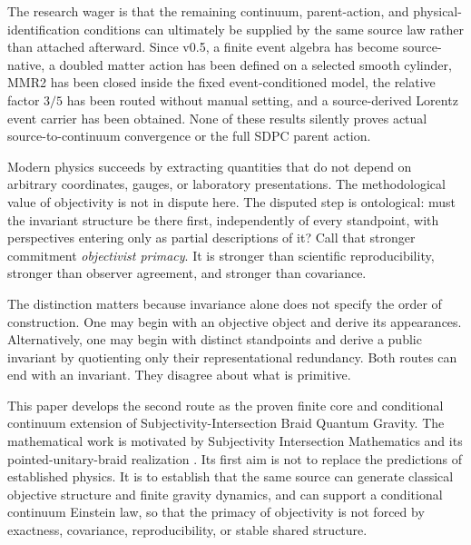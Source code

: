 \documentclass[11pt]{article}
\theoremstyle{definition}
\theoremstyle{remark}
\begin{document}
The research wager is that the remaining continuum, parent-action, and physical-identification conditions can ultimately be supplied by the same source law rather than attached afterward. Since v0.5, a finite event algebra has become source-native, a doubled matter action has been defined on a selected smooth cylinder, MMR2 has been closed inside the fixed event-conditioned model, the relative factor $3/5$ has been routed without manual setting, and a source-derived Lorentz event carrier has been obtained. None of these results silently proves actual source-to-continuum convergence or the full SDPC parent action.

Modern physics succeeds by extracting quantities that do not depend on arbitrary coordinates, gauges, or laboratory presentations. The methodological value of objectivity is not in dispute here. The disputed step is ontological: must the invariant structure be there first, independently of every standpoint, with perspectives entering only as partial descriptions of it? Call that stronger commitment \emph{objectivist primacy}. It is stronger than scientific reproducibility, stronger than observer agreement, and stronger than covariance.

The distinction matters because invariance alone does not specify the order of construction. One may begin with an objective object and derive its appearances. Alternatively, one may begin with distinct standpoints and derive a public invariant by quotienting only their representational redundancy. Both routes can end with an invariant. They disagree about what is primitive.

This paper develops the second route as the proven finite core and conditional continuum extension of Subjectivity-Intersection Braid Quantum Gravity. The mathematical work is motivated by Subjectivity Intersection Mathematics and its pointed-unitary-braid realization \cite{watanabe2026sim,watanabe2026braid}. Its first aim is not to replace the predictions of established physics. It is to establish that the same source can generate classical objective structure and finite gravity dynamics, and can support a conditional continuum Einstein law, so that the primacy of objectivity is not forced by exactness, covariance, reproducibility, or stable shared structure.
\end{document}
